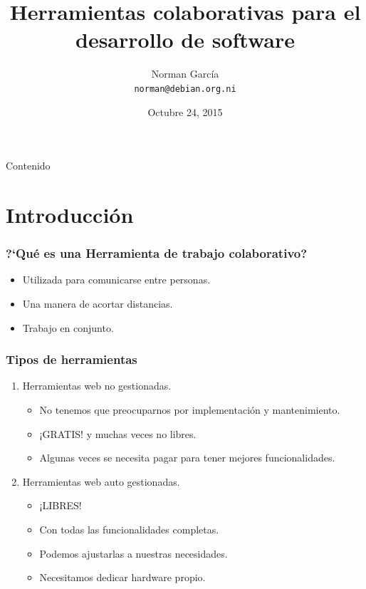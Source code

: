 \documentclass{beamer}
\title{Herramientas colaborativas para el desarrollo de software}
\author[n0rman]{Norman Garc\'ia \\ \texttt{norman@debian.org.ni}}
\institute{Debian Nicaragua}
\date{Octubre 24, 2015}
\begin{document}
\begin{frame}
	\titlepage
\end{frame}

\begin{frame}{Contenido}
	\tableofcontents
\end{frame}


\section{Introducci\'on}

\begin{frame}
\frametitle{?`Qu\'e es una Herramienta de trabajo colaborativo?}
        
	\begin{itemize}
        \pause \item Utilizada para comunicarse entre personas.
		\pause \item Una manera de acortar distancias.
		\pause \item Trabajo en conjunto.
       \end{itemize}

\end{frame}

\begin{frame}
\frametitle{Tipos de herramientas}
	\begin{enumerate}
		\pause \item Herramientas web no gestionadas.
		\begin{itemize}
			\pause \item No tenemos que preocuparnos por implementaci\'on y mantenimiento.
			\pause \item \alert{¡GRATIS!} y muchas veces no libres.
			\pause \item Algunas veces se necesita pagar para tener mejores funcionalidades.
		\end{itemize}
		\pause \item Herramientas web auto gestionadas.
		\begin{itemize}
			\pause \item \alert{¡LIBRES!}
			\pause \item Con todas las funcionalidades completas.
			\pause \item Podemos ajustarlas a nuestras necesidades.
			\pause \item Necesitamos dedicar hardware propio.
		\end{itemize}
    \end{enumerate}
    
\end{frame}
 
\end{document}
